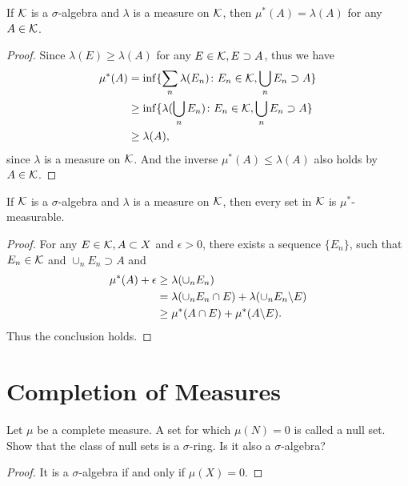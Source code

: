 \begin{pro}%
	If $\mathcal{K}$ is a $\sigma$-algebra and $\lambda$ is a measure on $\mathcal{K}$, then $\mu^*(A)=\lambda(A)$ for any $A\in\mathcal{K}$.
\end{pro}
\begin{proof}
	Since $\lambda(E)\geq \lambda(A)$ for any $E\in\mathcal{K},E\supset A$, thus we have 
	\begin{align*}
	\mu^*(A)&=\inf\{\sum_{n}\lambda(E_n)\colon E_n\in\mathcal{K},\bigcup_n E_n\supset A\}\\
			&\geq \inf\{\lambda(\bigcup_n E_n)\colon E_n\in\mathcal{K},\bigcup_n E_n\supset A\}\\	
	        &\geq \lambda(A),
	 \end{align*}
	since $\lambda$ is a measure on $\mathcal{K}$. And the inverse $\mu^*(A)\leq \lambda(A)$ also holds by $A\in\mathcal{K}$.
\end{proof}

\begin{pro}%
	If $\mathcal{K}$ is a $\sigma$-algebra and $\lambda$ is a measure on $\mathcal{K}$, then every set in $\mathcal{K}$ is $\mu^*$-measurable.
\end{pro}
\begin{proof}
	For any $E\in\mathcal{K},A\subset X$ and $\epsilon>0$, there exists a sequence $\{E_n\}$, such that $E_n\in \mathcal{K}$ and $\cup_n E_n\supset A$ and
	\begin{align*}
		\mu^*(A)+\epsilon&\geq \lambda(\cup_n E_n)\\
						 &=\lambda(\cup_n E_n\cap E)+\lambda(\cup_n E_n\backslash E)\\
						 &\geq \mu^*(A\cap E)+\mu^*(A\backslash E).
	\end{align*}
	Thus the conclusion holds.
\end{proof}

\section{Completion of Measures}
\begin{pro}%
	Let $\mu$ be a complete measure. A set for which $\mu(N)=0$ is called a null set. Show that the class of null sets is a $\sigma$-ring. Is it also a $\sigma$-algebra?
\end{pro}
\begin{proof}
	It is a $\sigma$-algebra if and only if $\mu(X)=0$.
\end{proof}


